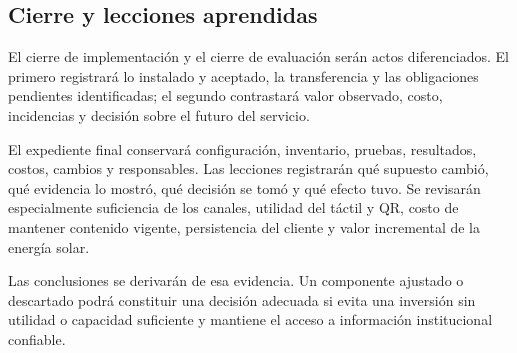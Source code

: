 \subsection{Cierre y lecciones aprendidas}
El cierre de implementación y el cierre de evaluación serán actos diferenciados. El primero registrará lo instalado y aceptado, la transferencia y las obligaciones pendientes identificadas; el segundo contrastará valor observado, costo, incidencias y decisión sobre el futuro del servicio.

El expediente final conservará configuración, inventario, pruebas, resultados, costos, cambios y responsables. Las lecciones registrarán qué supuesto cambió, qué evidencia lo mostró, qué decisión se tomó y qué efecto tuvo. Se revisarán especialmente suficiencia de los canales, utilidad del táctil y QR, costo de mantener contenido vigente, persistencia del cliente y valor incremental de la energía solar.

Las conclusiones se derivarán de esa evidencia. Un componente ajustado o descartado podrá constituir una decisión adecuada si evita una inversión sin utilidad o capacidad suficiente y mantiene el acceso a información institucional confiable.
